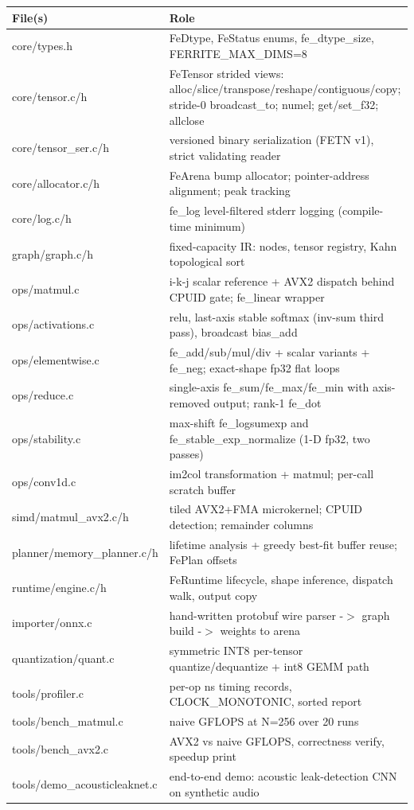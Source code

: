 \documentclass[11pt,a4paper]{article}
\begin{document}
\begin{tabularx}{0.94\textwidth}{@{}l X@{}}
\toprule
\textbf{File(s)} & \textbf{Role} \\
\midrule
core/types.h & FeDtype, FeStatus enums, fe\_dtype\_size, FERRITE\_MAX\_DIMS=8 \\
core/tensor.c/h & FeTensor strided views: alloc/slice/transpose/reshape/contiguous/copy; stride-0 broadcast\_to; numel; get/set\_f32; allclose \\
core/tensor\_ser.c/h & versioned binary serialization (FETN v1), strict validating reader \\
core/allocator.c/h & FeArena bump allocator; pointer-address alignment; peak tracking \\
core/log.c/h & fe\_log level-filtered stderr logging (compile-time minimum) \\
graph/graph.c/h & fixed-capacity IR: nodes, tensor registry, Kahn topological sort \\
ops/matmul.c & i-k-j scalar reference + AVX2 dispatch behind CPUID gate; fe\_linear wrapper \\
ops/activations.c & relu, last-axis stable softmax (inv-sum third pass), broadcast bias\_add \\
ops/elementwise.c & fe\_add/sub/mul/div + scalar variants + fe\_neg; exact-shape fp32 flat loops \\
ops/reduce.c & single-axis fe\_sum/fe\_max/fe\_min with axis-removed output; rank-1 fe\_dot \\
ops/stability.c & max-shift fe\_logsumexp and fe\_stable\_exp\_normalize (1-D fp32, two passes) \\
ops/conv1d.c & im2col transformation + matmul; per-call scratch buffer \\
simd/matmul\_avx2.c/h & tiled AVX2+FMA microkernel; CPUID detection; remainder columns \\
planner/memory\_planner.c/h & lifetime analysis + greedy best-fit buffer reuse; FePlan offsets \\
runtime/engine.c/h & FeRuntime lifecycle, shape inference, dispatch walk, output copy \\
importer/onnx.c & hand-written protobuf wire parser -$>$ graph build -$>$ weights to arena \\
quantization/quant.c & symmetric INT8 per-tensor quantize/dequantize + int8 GEMM path \\
tools/profiler.c & per-op ns timing records, CLOCK\_MONOTONIC, sorted report \\
tools/bench\_matmul.c & naive GFLOPS at N=256 over 20 runs \\
tools/bench\_avx2.c & AVX2 vs naive GFLOPS, correctness verify, speedup print \\
tools/demo\_acousticleaknet.c & end-to-end demo: acoustic leak-detection CNN on synthetic audio \\
\bottomrule
\end{tabularx}
\end{document}

